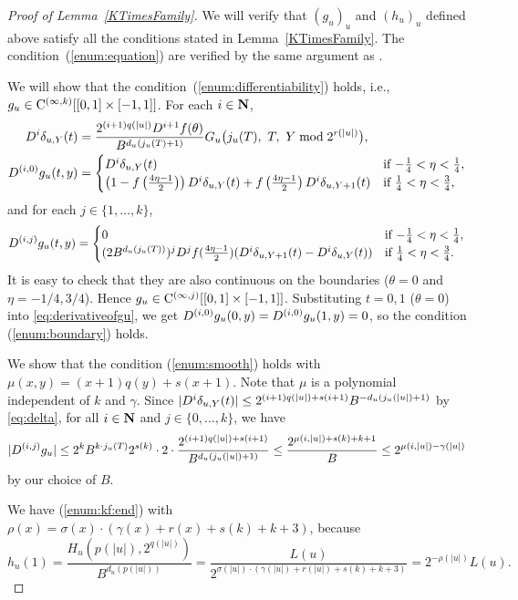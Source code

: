 \begin{proof}[Proof of Lemma~\ref{KTimesFamily}]
We will verify that $(g_u)_u$ and $(h_u)_u$ defined above satisfy all the conditions stated in Lemma~\ref{KTimesFamily}.
The condition~(\ref{enum:equation}) are verified by the same argument as
\cite[Lemma 4.1]{kawamura2010lipschitz}.

We will show that the condition~(\ref{enum:differentiability}) holds, i.e., $g _u \in \mathrm C^{(\infty, k)}[[0,1] \times [-1, 1]]$.
For each $i \in \mathbf N$,
  \begin{align}
   D^i \delta_{u,Y}(t) 
&
    = \frac{2^{(i+1)q(|u|)} D^{i+1}f(\theta)}{B^{d_u(j_u(T)+1)}}
    G_u\bigl( j_u(T),\ T,\ Y \bmod 2^{r(|u|)} \bigr),
\\
   \label{eq:derivativeofgu}
    D^{(i,0)} g_u(t, y)
&
     = \begin{cases}
 	D^i \delta_{u, Y}(t) 
	& \text{if} \ {-\frac 1 4} < \eta < \frac 1 4, \\
	\left( 1-f \left(\frac{4\eta-1}{2}\right)\right) 
	D^i \delta_{u, Y}(t)
	+ f \left(\frac{4\eta-1}{2}\right) D^i \delta_{u,Y+1}(t) 
	& \text{if} \ \frac 1 4 < \eta < \frac 3 4,
       \end{cases}
  \end{align}
and for each  $j \in \{1, \dots , k\}$,
  \begin{equation}
    D^{(i,j)} g_u(t, y)
     = \begin{cases}
	0 & \text{if} \ {-\frac 1 4} < \eta < \frac 1 4, \\
	(2B^{d_u(j_u(T))})^j D^j f(\frac{4\eta - 1}2)
	(D^i \delta_{u,Y+1}(t)-D^i \delta_{u, Y}(t)) 
	& \text{if} \ \frac 1 4 < \eta < \frac 3 4.
       \end{cases}
  \end{equation}
It is easy to check that they are also continuous on the boundaries 
($\theta = 0$ and $\eta = -1/4, 3/4$).
Hence $g _u \in \mathrm C^{(\infty, j)}[[0,1] \times [-1,1]]$.
Substituting $t = 0, 1$ ($\theta = 0$) into \eqref{eq:derivativeofgu},
we get $D^{(i, 0)} g_u(0,y) = D^{(i, 0)} g_u(1,y) = 0$, 
so the condition (\ref{enum:boundary}) holds.

We show that the condition (\ref{enum:smooth}) holds with $\mu(x, y) = (x+1)q(y) + s(x+1)$.
Note that $\mu$ is a polynomial independent of $k$ and $\gamma$.
Since $|D^i \delta_{u,Y}(t)| \le 2^{(i+1)q(|u|) + s(i+1)}B^{-d_u(j_u(|u|)+1)}$ by \eqref{eq:delta}, for all $i \in \mathbf N$ and $j \in \{0, \dots, k\}$, we have
 \begin{equation}
  |D^{(i,j)} g_u| 
   \le 
   2^k B^{k \cdot j_u(T)} 2^{s(k)} \cdot 2 \cdot 
   \frac{2^{(i+1)q(|u|) + s(i+1)}}{B^{d_u(j_u(|u|)+1)}} 
   \le
   \frac{2^{\mu(i, |u|) + s(k) + k + 1}}{B}
   \le
   2^{\mu(i, |u|) - \gamma(|u|)}
 \end{equation}
 by our choice of $B$.

We have (\ref{enum:kf:end}) with
  $\rho(x) = \sigma(x) \cdot (\gamma(x)+r(x)+s(k)+k+3)$, because
  \begin{equation}
   h_u(1) = \frac{H_u(p(|u|), 2^{q(|u|)})}{B^{d_u(p(|u|))}} 
          = \frac{L(u)}{2^{\sigma(|u|) \cdot (\gamma(|u|)+r(|u|)+s(k)+k+3)}}
	  = 2^{-\rho(|u|)} L(u).
  \end{equation}
 \end{proof}
